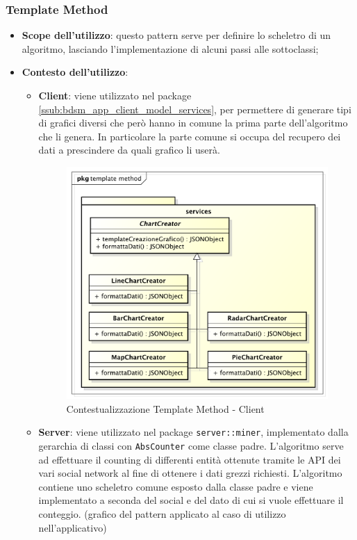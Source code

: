 	\subsubsection{Template Method} %
	\label{ssub:template_method}
		\begin{itemize}
			\item \textbf{Scope dell'utilizzo}: questo pattern serve per definire lo scheletro di un algoritmo, lasciando l'implementazione di alcuni passi alle sottoclassi;
			\item \textbf{Contesto dell'utilizzo}:
				\begin{itemize}
					\item \textbf{Client}: viene utilizzato nel package \ref{ssub:bdsm_app_client_model_services}, per permettere di generare tipi di grafici diversi che però hanno in comune la prima parte dell'algoritmo che li genera. In particolare la parte comune si occupa del recupero dei dati a prescindere da quali grafico li userà.
					\begin{figure}[htbp]
						\centering
						\centerline{\includegraphics[scale=0.50]{./images/design_pattern_client/client_template_method.pdf}}
						\caption{Contestualizzazione Template Method - Client}
					\end{figure}

					\item \textbf{Server}: viene utilizzato nel package \texttt{server::miner}, implementato dalla gerarchia di classi con \texttt{AbsCounter} come classe padre. L'algoritmo serve ad effettuare il counting di differenti entità ottenute tramite le API dei vari social network al fine di ottenere i dati grezzi richiesti. L'algoritmo contiene uno scheletro comune esposto dalla classe padre e viene implementato a seconda del social e del dato di cui si vuole effettuare il conteggio. \newline
					[TO DO] (grafico del pattern applicato al caso di utilizzo nell'applicativo)
				\end{itemize}
		\end{itemize}



